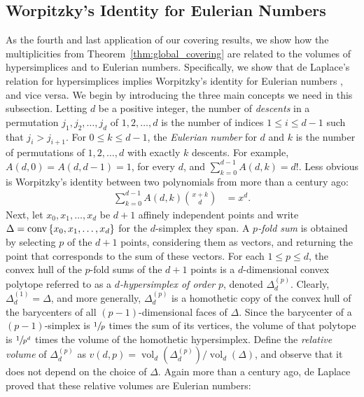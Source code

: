 \documentclass[a4paper,UKenglish,cleveref, autoref,numberwithinsect]{socg-lipics-v2021}
\newcommand {\mm}[1] {\ifmmode{#1}\else{\mbox{\(#1\)}}\fi}
\theoremstyle{plain}
\newcommand{\conv}[1]       {\mm{{\rm conv\,}{#1}}}
\DeclareMathOperator{\vol}{vol}
\begin{document}
\subsection{Worpitzky's Identity for Eulerian Numbers}
\label{sec:4.4}
As the fourth and last application of our covering results, we show how the multiplicities from Theorem~\ref{thm:global_covering} are related to the volumes of hypersimplices and to Eulerian numbers.
Specifically, we show that de Laplace's relation for hypersimplices \cite{Lap86} implies Worpitzky's identity for Eulerian numbers \cite{Wor83}, and vice versa.
\smallskip
We begin by introducing the three main concepts we need in this subsection.
Letting $d$ be a positive integer, the number of \emph{descents} in a permutation $j_1, j_2, \ldots, j_d$ of $1, 2, \ldots, d$ is the number of indices $1 \leq i \leq d-1$ such that $j_i > j_{i+1}$.
For $0 \leq k \leq d-1$, the \emph{Eulerian number} for $d$ and $k$ is the number of permutations of $1,2,\ldots,d$ with exactly $k$ descents.
For example, $A(d,0) = A(d,d-1) = 1$, for every $d$, and $\sum_{k=0}^{d-1} A(d,k) = d!$.
Less obvious is Worpitzky's identity \cite{Wor83} between two polynomials from more than a century ago:
\begin{align}
  \sum\nolimits_{k=0}^{d-1} A(d,k) \binom{x+k}{d} &= x^d .
  \label{eqn:Worpitzky_identity}
\end{align}
Next, let $x_0, x_1, \ldots, x_d$ be $d+1$ affinely independent points and write $\Delta = \conv{\{x_0, x_1, \ldots, x_d\}}$ for the $d$-simplex they span.
A \emph{$p$-fold sum} is obtained by selecting $p$ of the $d+1$ points, considering them as vectors, and returning the point that corresponds to the sum of these vectors.
For each $1 \leq p \leq d$, the convex hull of the $p$-fold sums of the $d+1$ points is a $d$-dimensional convex polytope referred to as a \emph{$d$-hypersimplex of order} $p$, denoted $\Delta_d^{(p)}$.
Clearly, $\Delta_d^{(1)} = \Delta$, and more generally, $\Delta_d^{(p)}$ is a homothetic copy of the convex hull of the barycenters of all $(p-1)$-dimensional faces of $\Delta$.
Since the barycenter of a $(p-1)$-simplex is $\sfrac{1}{p}$ times the sum of its vertices, the volume of that polytope is $\sfrac{1}{p^d}$ times the volume of the homothetic hypersimplex.
Define the \emph{relative volume} of $\Delta_d^{(p)}$ as $v(d,p) = {\vol_d(\Delta^{(p)}_d)} / {\vol_d(\Delta)}$, and observe that it does not depend on the choice of $\Delta$.
Again more than a century ago, de Laplace~\cite{Lap86} proved that these relative volumes are Eulerian numbers:
\end{document}
